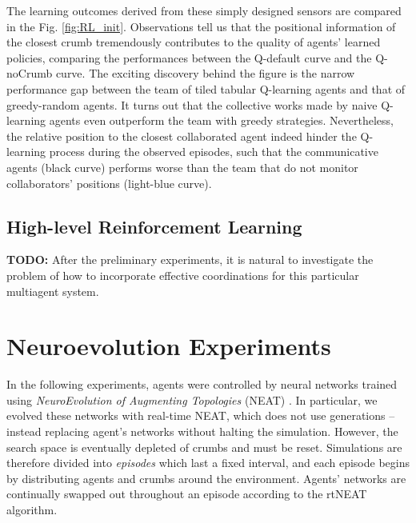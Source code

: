 \documentclass[conference]{IEEEtran}
\begin{document}
The learning outcomes derived from these simply designed sensors are compared
in the Fig. \ref{fig:RL_init}. 
Observations tell us that the positional information of the closest crumb
tremendously contributes to the quality of agents' learned policies, comparing
the performances between the Q-default curve and the Q-noCrumb curve. 
 The exciting discovery behind the figure is the narrow performance gap
 between the team of tiled tabular Q-learning agents and that of greedy-random
 agents. It turns out that the collective works made by naive Q-learning
 agents even outperform the team with greedy strategies.
Nevertheless, the relative position to the closest collaborated agent indeed
hinder the Q-learning process during the observed episodes, such that the
communicative agents (black curve) performs worse than the team that do not
monitor collaborators' positions (light-blue curve).

\subsection{High-level Reinforcement Learning}
\textbf{TODO:}
After the preliminary experiments, it is natural to investigate the problem of how
to incorporate effective coordinations for this particular multiagent system.



\section{Neuroevolution Experiments}
\label{section:neuro}

In the following experiments, agents were controlled by neural networks
trained using \textit{NeuroEvolution of Augmenting Topologies} (NEAT)
\cite{stanley2002evolving}.
In particular, we evolved these networks with real-time NEAT, which does not use generations -- instead replacing agent's networks without halting the simulation. However, the search space is eventually depleted of crumbs and must be reset. Simulations are therefore divided into \textit{episodes} which last a fixed interval, and  each episode begins by distributing agents and crumbs around the environment. Agents' networks are continually swapped out throughout an episode according to the rtNEAT algorithm.
\end{document}
